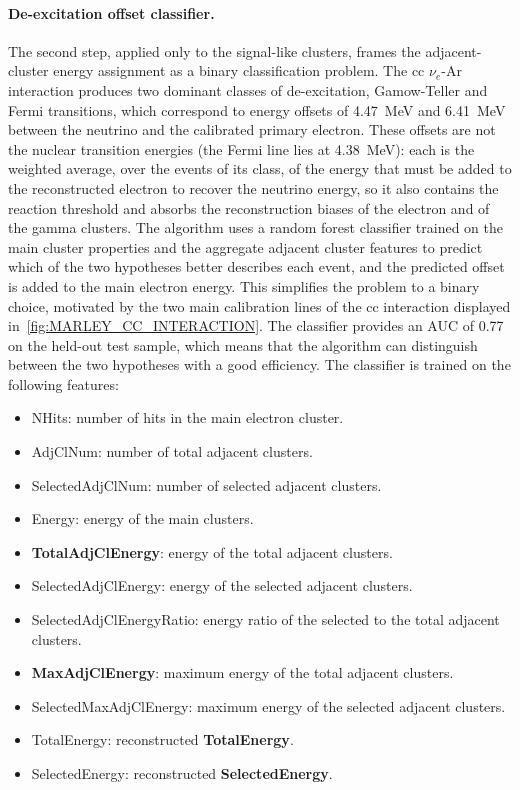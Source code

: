 \paragraph{De-excitation offset classifier.} The second step, applied only to the signal-like clusters, frames the adjacent-cluster energy assignment as a binary classification problem. The \gls{cc} $\nu_e$-Ar interaction produces two dominant classes of de-excitation, Gamow-Teller and Fermi transitions, which correspond to energy offsets of \SI{4.47}{\mega\electronvolt} and \SI{6.41}{\mega\electronvolt} between the neutrino and the calibrated primary electron. These offsets are not the nuclear transition energies (the Fermi line lies at \SI{4.38}{\mega\electronvolt}): each is the weighted average, over the events of its class, of the energy that must be added to the reconstructed electron to recover the neutrino energy, so it also contains the reaction threshold and absorbs the reconstruction biases of the electron and of the gamma clusters. The algorithm uses a random forest classifier trained on the main cluster properties and the aggregate adjacent cluster features to predict which of the two hypotheses better describes each event, and the predicted offset is added to the main electron energy. This simplifies the problem to a binary choice, motivated by the two main calibration lines of the \gls{cc} interaction displayed in~\cref{fig:MARLEY_CC_INTERACTION}. The classifier provides an AUC of \num{0.77} on the held-out test sample, which means that the algorithm can distinguish between the two hypotheses with a good efficiency. The classifier is trained on the following features:

\begin{itemize}
    \item NHits: number of hits in the main electron cluster.
    \item AdjClNum: number of total adjacent clusters.
    \item SelectedAdjClNum: number of selected adjacent clusters.
    \item Energy: energy of the main clusters.
    \item \textbf{TotalAdjClEnergy}: energy of the total adjacent clusters.
    \item SelectedAdjClEnergy: energy of the selected adjacent clusters.
    \item SelectedAdjClEnergyRatio: energy ratio of the selected to the total adjacent clusters.
    \item \textbf{MaxAdjClEnergy}: maximum energy of the total adjacent clusters.
    \item SelectedMaxAdjClEnergy: maximum energy of the selected adjacent clusters.
    \item TotalEnergy: reconstructed \textbf{TotalEnergy}.
    \item SelectedEnergy: reconstructed \textbf{SelectedEnergy}.
\end{itemize}

